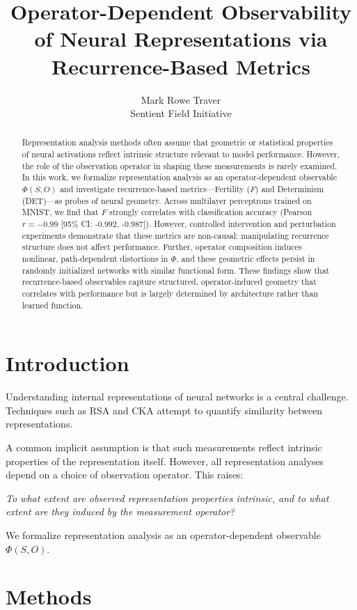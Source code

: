 \documentclass[11pt]{article}
\title{\textbf{Operator-Dependent Observability of Neural Representations via Recurrence-Based Metrics}}
\author{
Mark Rowe Traver \\
Sentient Field Initiative
}
\date{}
\begin{document}
\maketitle

\begin{abstract}
	Representation analysis methods often assume that geometric or statistical properties of neural activations reflect intrinsic structure relevant to model performance. However, the role of the observation operator in shaping these measurements is rarely examined. In this work, we formalize representation analysis as an operator-dependent observable $\Phi(S, O)$ and investigate recurrence-based metrics—Fertility ($F$) and Determinism (DET)—as probes of neural geometry. Across multilayer perceptrons trained on MNIST, we find that $F$ strongly correlates with classification accuracy (Pearson $r = -0.99$ [95\% CI: -0.992, -0.987]). However, controlled intervention and perturbation experiments demonstrate that these metrics are non-causal: manipulating recurrence structure does not affect performance. Further, operator composition induces nonlinear, path-dependent distortions in $\Phi$, and these geometric effects persist in randomly initialized networks with similar functional form. These findings show that recurrence-based observables capture structured, operator-induced geometry that correlates with performance but is largely determined by architecture rather than learned function.
\end{abstract}

\section{Introduction}

Understanding internal representations of neural networks is a central challenge. Techniques such as RSA and CKA attempt to quantify similarity between representations.

A common implicit assumption is that such measurements reflect intrinsic properties of the representation itself. However, all representation analyses depend on a choice of observation operator. This raises:

\textit{To what extent are observed representation properties intrinsic, and to what extent are they induced by the measurement operator?}

We formalize representation analysis as an operator-dependent observable $\Phi(S, O)$.

\section{Methods}
\end{document}
